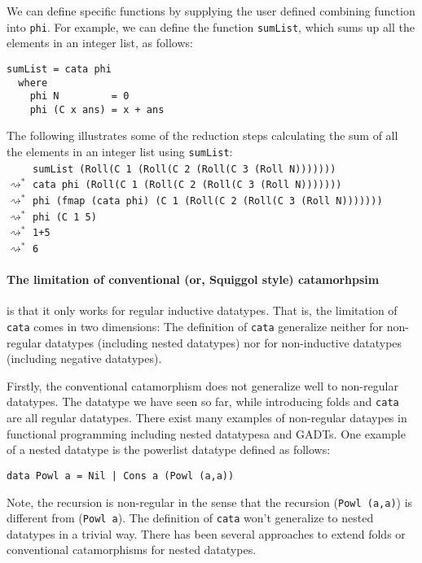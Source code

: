 We can define specific functions by supplying the user defined combining
function into \texttt{phi}. For example, we can define the function
\texttt{sumList}, which sums up all the elements in an integer list,
as follows:
\begin{verbatim}
sumList = cata phi
  where
    phi N         = 0
    phi (C x ans) = x + ans
\end{verbatim}
The following illustrates some of the reduction steps calculating the sum of
all the elements in an integer list using \texttt{sumList}:\\
$\phantom{\rightsquigarrow^{*}}$
\verb|sumList (Roll(C 1 (Roll(C 2 (Roll(C 3 (Roll N)))))))|\\
$\rightsquigarrow^{*}$ \verb|cata phi (Roll(C 1 (Roll(C 2 (Roll(C 3 (Roll N)))))))|\\
$\rightsquigarrow^{*}$ \verb|phi (fmap (cata phi) (C 1 (Roll(C 2 (Roll(C 3 (Roll N)))))))|\\
$\rightsquigarrow^{*}$ \verb|phi (C 1 5)|\\
$\rightsquigarrow^{*}$ \verb|1+5|\\
$\rightsquigarrow^{*}$ \verb|6|

\paragraph{The limitation of conventional (or, Squiggol style) catamorhpsim}
is that it only works for regular inductive datatypes. That is, the limitation
of \texttt{cata} comes in two dimensions:
The definition of \texttt{cata} generalize neither
for non-regular datatypes (including nested datatypes)
nor for non-inductive datatypes (including negative datatypes).

Firstly, the conventional catamorphism does not generalize well to
non-regular datatypes. The datatype we have seen so far, while introducing
folds and \texttt{cata} are all regular datatypes. There exist many examples of
non-regular dataypes in functional programming including nested datatypesa
and GADTs. One example of a nested datatype is the powerlist datatype defined
as follows:
\begin{verbatim}
data Powl a = Nil | Cons a (Powl (a,a))
\end{verbatim}
Note, the recursion is non-regular in the sense that the recursion
(\texttt{Powl (a,a)}) is different from (\texttt{Powl a}).
The definition of \texttt{cata} won't generalize to nested datatypes
in a trivial way.
There has been several approaches \cite{BirPat99,MarGibBay04,Hin00}
to extend folds or conventional catamorphisms for nested datatypes.

